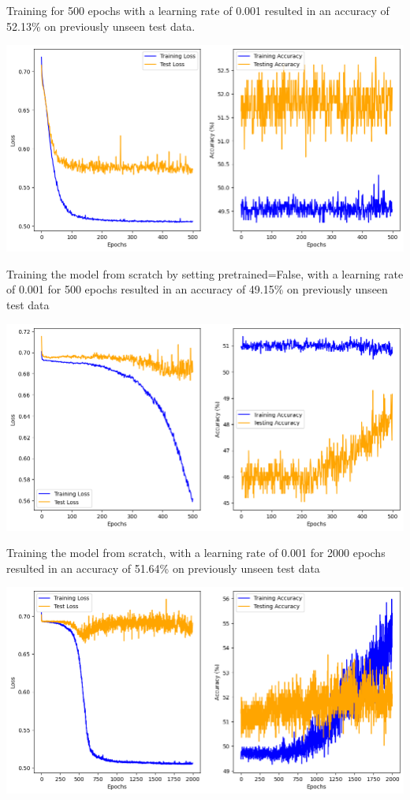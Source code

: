 Training for 500 epochs with a learning rate of 0.001 resulted in an accuracy
of 52.13\% on previously unseen test data.

\includegraphics*[width=\textwidth]{Figures/ResNet50_classifier_LR001_chart.png}

Training the model from scratch by setting pretrained=False, with a learning
rate of 0.001 for 500 epochs resulted in an  accuracy of 49.15\% on previously
unseen test data

\includegraphics*[width=\textwidth]{Figures/ResNet50_untrained_LR001.png}

Training the model from scratch, with a learning rate of 0.001 for 2000 epochs
resulted in an accuracy of 51.64\% on previously unseen test data

\includegraphics*[width=\textwidth]{Figures/ResNet50_untrain_LR001_2000.png}

